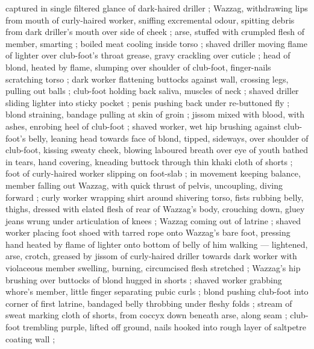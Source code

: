 captured in single filtered glance of dark-haired driller ; Wazzag, withdrawing lips from mouth of curly-haired worker, sniffing excremental odour, spitting debris from dark driller's mouth over side of cheek ; arse, stuffed with crumpled flesh of member, smarting ; boiled meat cooling inside torso ; shaved driller moving flame of lighter over club-foot's throat {\col} grease, gravy crackling over cuticle ; head of blond, heated by flame, slumping over shoulder of club-foot, finger-nails scratching torso ; dark worker flattening buttocks against wall, crossing legs, pulling out balls ; club-foot holding back saliva, muscles of neck ; shaved driller sliding lighter into sticky pocket ; penis pushing back under re-buttoned fly ; blond straining, bandage pulling at skin of groin ; jissom mixed with blood, with ashes, enrobing heel of club-foot ; shaved worker, wet hip brushing against club-foot's belly, leaning head towards face of blond, tipped, sideways, over shoulder of club-foot, kissing sweaty cheek, blowing laboured breath over eye of youth bathed in tears, hand covering, kneading buttock through thin khaki cloth of shorts ; foot of curly-haired worker slipping on foot-slab ; in movement keeping balance, member falling out {\col} Wazzag, with quick thrust of pelvis, uncoupling, diving forward ; curly worker wrapping shirt around shivering torso, fists rubbing belly, thighs, dressed with elated flesh of rear of Wazzag's body, crouching down, gluey jeans wrung under articulation of knees ; Wazzag coming out of latrine ; shaved worker placing foot shoed with tarred rope onto Wazzag's bare foot, pressing hand heated by flame of lighter onto bottom of belly of him walking --- lightened, arse, crotch, greased by jissom of curly-haired driller {\dashcol} towards dark worker with violaceous member swelling, burning, circumcised flesh stretched ; Wazzag's hip brushing over buttocks of blond hugged in shorts ; shaved worker grabbing whore's member, little finger separating pubic curls ; blond pushing club-foot into corner of first latrine, bandaged belly throbbing under fleshy folds ; stream of sweat marking cloth of shorts, from coccyx down beneath arse, along seam ; club-foot trembling purple, lifted off ground, nails hooked into rough layer of saltpetre coating wall ;
